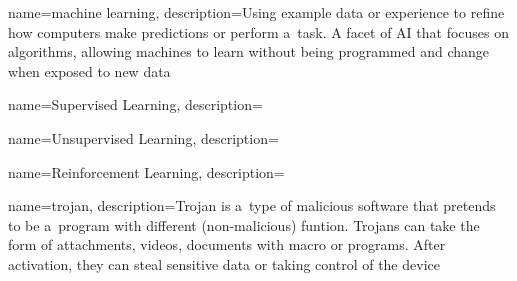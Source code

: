 {
    name={machine learning},
    description={Using example data or experience to refine how computers make predictions or perform a~task.
A facet of AI that focuses on algorithms, allowing machines to learn without being programmed and change when exposed to new data}
}
 
{
    name={Supervised Learning},
    description={}
}

{
    name={Unsupervised Learning},
    description={}
}

{
    name={Reinforcement Learning},
    description={}
}

{
    name={trojan},
    description={Trojan is a~type of malicious software that pretends to be a~program with different (non-malicious) funtion.
Trojans can take the form of attachments, videos, documents with macro or programs.
After activation, they can steal sensitive data or taking control of the device}
}

 








